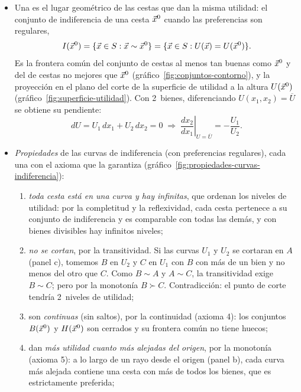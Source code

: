 \documentclass[11pt]{article}
\begin{document}
\begin{itemize}
\item Una  es el lugar geométrico de las cestas que dan la misma utilidad: el conjunto de indiferencia de una cesta $\vec{x}^0$ cuando las preferencias son regulares,
  \begin{equation}
  I(\vec{x}^0)=\{\vec{x}\in S: \vec{x}\sim \vec{x}^0\}=\{\vec{x}\in S: U(\vec{x})=U(\vec{x}^0)\}. \label{eq:curva-indiferencia}
  \end{equation}
  Es la frontera común del conjunto de cestas al menos tan buenas como $\vec{x}^0$ y del de cestas no mejores que $\vec{x}^0$ (gráfico~\ref{fig:conjuntos-contorno}), y la proyección en el plano del corte de la superficie de utilidad a la altura $U(\vec{x}^0)$ (gráfico~\ref{fig:superficie-utilidad}). Con 2~bienes, diferenciando $U(x_1,x_2)=\overline{U}$ se obtiene su pendiente:
  \begin{equation}
  dU=U_1\,dx_1+U_2\,dx_2=0 \;\Longrightarrow\; \left.\frac{dx_2}{dx_1}\right|_{U=\overline{U}}=-\frac{U_1}{U_2}. \label{eq:pendiente-ci}
  \end{equation}
\item \emph{Propiedades} de las curvas de indiferencia (con preferencias regulares), cada una con el axioma que la garantiza (gráfico~\ref{fig:propiedades-curvas-indiferencia}):
  \begin{enumerate}
  \item \emph{toda cesta está en una curva y hay infinitas}, que ordenan los niveles de utilidad: por la completitud y la reflexividad, cada cesta pertenece a su conjunto de indiferencia y es comparable con todas las demás, y con bienes divisibles hay infinitos niveles;
  \item \emph{no se cortan}, por la transitividad. Si las curvas $U_1$ y $U_2$ se cortaran en $A$ (panel c), tomemos $B$ en $U_2$ y $C$ en $U_1$ con $B$ con más de un bien y no menos del otro que $C$. Como $B\sim A$ y $A\sim C$, la transitividad exige $B\sim C$; pero por la monotonía $B\succ C$. Contradicción: el punto de corte tendría 2~niveles de utilidad;\findemo
  \item son \emph{continuas} (sin saltos), por la continuidad (axioma 4): los conjuntos $B(\vec{x}^0)$ y $H(\vec{x}^0)$ son cerrados y su frontera común no tiene huecos;
  \item dan \emph{más utilidad cuanto más alejadas del origen}, por la monotonía (axioma 5): a lo largo de un rayo desde el origen (panel b), cada curva más alejada contiene una cesta con más de todos los bienes, que es estrictamente preferida;

\end{enumerate}
\end{itemize}
\end{document}
